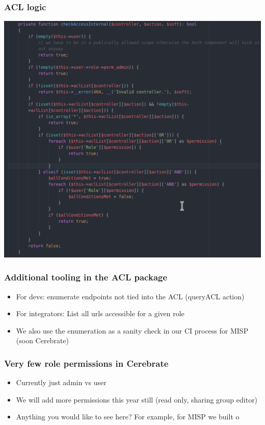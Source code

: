\begin{frame}
  \frametitle{ACL logic}
  \begin{center}
    \includegraphics[scale=0.3]{ACLCheck.png}
  \end{center}
\end{frame}

\begin{frame}
  \frametitle{Additional tooling in the ACL package}
  \begin{itemize}
    \item For devs: enumerate endpoints not tied into the ACL (queryACL action)
    \item For integrators: List all urls accessible for a given role
    \item We also use the enumeration as a sanity check in our CI process for MISP (soon Cerebrate)
  \end{itemize}
\end{frame}

\begin{frame}
  \frametitle{Very few role permissions in Cerebrate}
  \begin{itemize}
    \item Currently just admin vs user
    \item We will add more permissions this year still (read only, sharing group editor)
    \item Anything you would like to see here? For example, for MISP we built o
  \end{itemize}
\end{frame}

